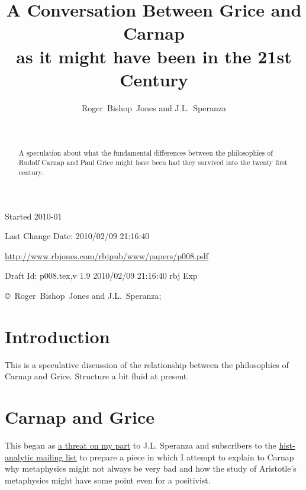 \documentclass{article}
\title{A Conversation Between Grice and Carnap\\ {\small as it might have been in the 21st Century}}
\author{Roger~Bishop~Jones and J.L.~Speranza
}
\date{\ }
\begin{document}
                               
\begin{titlepage}

\maketitle

\begin{abstract}
A speculation about what the fundamental differences between the philosophies of Rudolf Carnap and Paul Grice might have been had they survived into the twenty first century.
\end{abstract}

\vfill

\begin{centering}

\vfill

\footnotesize{
Started 2010-01

Last Change $ $Date: 2010/02/09 21:16:40 $ $

\href{http://www.rbjones.com/rbjpub/www/papers/p008.pdf}{http://www.rbjones.com/rbjpub/www/papers/p008.pdf}

Draft $ $Id: p008.tex,v 1.9 2010/02/09 21:16:40 rbj Exp $ $

\copyright\ Roger~Bishop~Jones and J.L.~Speranza;

}%
\end{centering}

\end{titlepage}

\newpage
\setcounter{tocdepth}{3}
{\parskip-0pt\tableofcontents}

\section{Introduction}

This is a speculative discussion of the relationship between the philosophies of Carnap and Grice.
Structure a bit fluid at present.

\section{Carnap and Grice}\label{CARNAPANDGRICE}

This began as \href{http://rbjones.com/pipermail/hist-analytic_rbjones.com/2009q2/000267.html}{a threat on my part} to J.L. Speranza and subscribers to the \href{http://www.hist-analytic.org/}{hist-analytic mailing list} to prepare a piece in which I attempt to explain to Carnap why metaphysics might not always be very bad and how the study of Aristotle's metaphysics might have some point even for a positivist.
\end{document}
